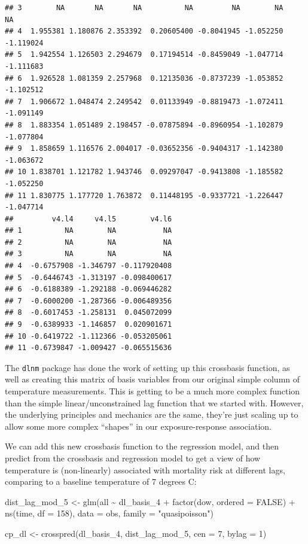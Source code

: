 \documentclass[
]{book}
\newenvironment{Shaded}{\begin{snugshade}}{\end{snugshade}}
\newcommand{\AttributeTok}[1]{\textcolor[rgb]{0.77,0.63,0.00}{#1}}
\newcommand{\ConstantTok}[1]{\textcolor[rgb]{0.00,0.00,0.00}{#1}}
\newcommand{\DecValTok}[1]{\textcolor[rgb]{0.00,0.00,0.81}{#1}}
\newcommand{\FunctionTok}[1]{\textcolor[rgb]{0.00,0.00,0.00}{#1}}
\newcommand{\NormalTok}[1]{#1}
\newcommand{\OtherTok}[1]{\textcolor[rgb]{0.56,0.35,0.01}{#1}}
\newcommand{\SpecialCharTok}[1]{\textcolor[rgb]{0.00,0.00,0.00}{#1}}
\newcommand{\StringTok}[1]{\textcolor[rgb]{0.31,0.60,0.02}{#1}}
\begin{document}
\begin{verbatim}
## 3        NA       NA       NA          NA         NA        NA        NA
## 4  1.955381 1.180876 2.353392  0.20605400 -0.8041945 -1.052250 -1.119024
## 5  1.942554 1.126503 2.294679  0.17194514 -0.8459049 -1.047714 -1.111683
## 6  1.926528 1.081359 2.257968  0.12135036 -0.8737239 -1.053852 -1.102512
## 7  1.906672 1.048474 2.249542  0.01133949 -0.8819473 -1.072411 -1.091149
## 8  1.883354 1.051489 2.198457 -0.07875894 -0.8960954 -1.102879 -1.077804
## 9  1.858659 1.116576 2.004017 -0.03652356 -0.9404317 -1.142380 -1.063672
## 10 1.838701 1.121782 1.943746  0.09297047 -0.9413808 -1.185582 -1.052250
## 11 1.830775 1.177720 1.763872  0.11448195 -0.9337721 -1.226447 -1.047714
##         v4.l4     v4.l5        v4.l6
## 1          NA        NA           NA
## 2          NA        NA           NA
## 3          NA        NA           NA
## 4  -0.6757908 -1.346797 -0.117920408
## 5  -0.6446743 -1.313197 -0.098400617
## 6  -0.6188389 -1.292188 -0.069446282
## 7  -0.6000200 -1.287366 -0.006489356
## 8  -0.6017453 -1.258131  0.045072099
## 9  -0.6389933 -1.146857  0.020901671
## 10 -0.6419722 -1.112366 -0.053205061
## 11 -0.6739847 -1.009427 -0.065515636
\end{verbatim}

The \texttt{dlnm} package has done
the work of setting up this crossbasis function, as well as creating this matrix of
basis variables from our original simple column of temperature measurements. This
is getting to be a much more complex function than the simple linear/unconstrained lag
function that we started with. However, the underlying principles and mechanics are the
same, they're just scaling up to allow some more complex ``shapes'' in our exposure-response
association.

We can add this new crossbasis function to the regression model, and then predict from
the crossbasis and regression model to get a view of how temperature is (non-linearly) associated
with mortality risk at different lags, comparing to a baseline temperature of 7 degrees C:

\begin{Shaded}
\begin{Highlighting}[]
\NormalTok{dist\_lag\_mod\_5 }\OtherTok{\textless{}{-}} \FunctionTok{glm}\NormalTok{(all }\SpecialCharTok{\textasciitilde{}}\NormalTok{ dl\_basis\_4 }\SpecialCharTok{+} 
                        \FunctionTok{factor}\NormalTok{(dow, }\AttributeTok{ordered =} \ConstantTok{FALSE}\NormalTok{) }\SpecialCharTok{+}
                          \FunctionTok{ns}\NormalTok{(time, }\AttributeTok{df =} \DecValTok{158}\NormalTok{), }
                        \AttributeTok{data =}\NormalTok{ obs, }\AttributeTok{family =} \StringTok{"quasipoisson"}\NormalTok{)}

\NormalTok{cp\_dl }\OtherTok{\textless{}{-}} \FunctionTok{crosspred}\NormalTok{(dl\_basis\_4, dist\_lag\_mod\_5, }\AttributeTok{cen =} \DecValTok{7}\NormalTok{, }\AttributeTok{bylag =} \DecValTok{1}\NormalTok{)}
\end{Highlighting}
\end{Shaded}
\end{document}
